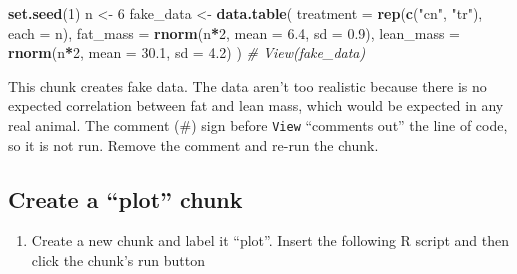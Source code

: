 \documentclass[]{book}
\newenvironment{Shaded}{\begin{snugshade}}{\end{snugshade}}
\newcommand{\CommentTok}[1]{\textcolor[rgb]{0.56,0.35,0.01}{\textit{#1}}}
\newcommand{\DataTypeTok}[1]{\textcolor[rgb]{0.13,0.29,0.53}{#1}}
\newcommand{\DecValTok}[1]{\textcolor[rgb]{0.00,0.00,0.81}{#1}}
\newcommand{\FloatTok}[1]{\textcolor[rgb]{0.00,0.00,0.81}{#1}}
\newcommand{\KeywordTok}[1]{\textcolor[rgb]{0.13,0.29,0.53}{\textbf{#1}}}
\newcommand{\NormalTok}[1]{#1}
\newcommand{\OperatorTok}[1]{\textcolor[rgb]{0.81,0.36,0.00}{\textbf{#1}}}
\newcommand{\StringTok}[1]{\textcolor[rgb]{0.31,0.60,0.02}{#1}}
\providecommand{\tightlist}{%
  \setlength{\itemsep}{0pt}\setlength{\parskip}{0pt}}
\begin{document}
\begin{Shaded}
\begin{Highlighting}[]
\KeywordTok{set.seed}\NormalTok{(}\DecValTok{1}\NormalTok{)}
\NormalTok{n <-}\StringTok{ }\DecValTok{6}
\NormalTok{fake_data <-}\StringTok{ }\KeywordTok{data.table}\NormalTok{(}
    \DataTypeTok{treatment =} \KeywordTok{rep}\NormalTok{(}\KeywordTok{c}\NormalTok{(}\StringTok{"cn"}\NormalTok{, }\StringTok{"tr"}\NormalTok{), }\DataTypeTok{each =}\NormalTok{ n),}
    \DataTypeTok{fat_mass =} \KeywordTok{rnorm}\NormalTok{(n}\OperatorTok{*}\DecValTok{2}\NormalTok{, }\DataTypeTok{mean =} \FloatTok{6.4}\NormalTok{, }\DataTypeTok{sd =} \FloatTok{0.9}\NormalTok{),}
    \DataTypeTok{lean_mass =} \KeywordTok{rnorm}\NormalTok{(n}\OperatorTok{*}\DecValTok{2}\NormalTok{, }\DataTypeTok{mean =} \FloatTok{30.1}\NormalTok{, }\DataTypeTok{sd =} \FloatTok{4.2}\NormalTok{)}
\NormalTok{)}
\CommentTok{# View(fake_data)}
\end{Highlighting}
\end{Shaded}

This chunk creates fake data. The data aren't too realistic because there is no expected correlation between fat and lean mass, which would be expected in any real animal. The comment (\#) sign before \texttt{View} ``comments out'' the line of code, so it is not run. Remove the comment and re-run the chunk.

\hypertarget{create-a-plot-chunk}{%
\subsection{Create a ``plot'' chunk}\label{create-a-plot-chunk}}

\begin{enumerate}
\def\labelenumi{\arabic{enumi}.}
\setcounter{enumi}{4}
\tightlist
\item
  Create a new chunk and label it ``plot''. Insert the following R script and then click the chunk's run button
\end{enumerate}
\end{document}
